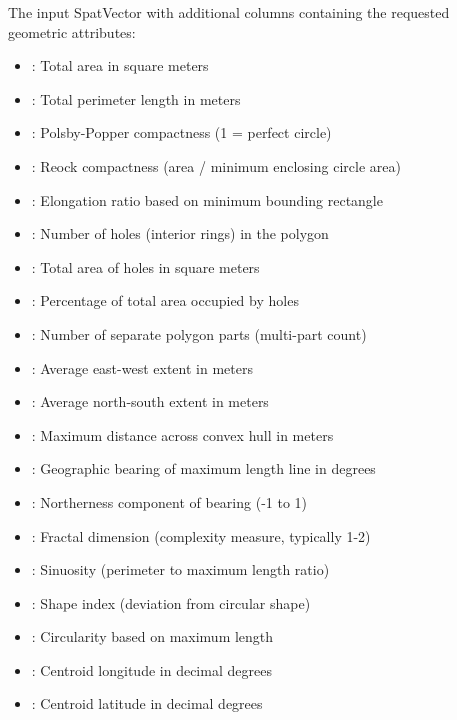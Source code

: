 \documentclass[letterpaper]{book}
\begin{document}
\begin{Value}
The input SpatVector with additional columns containing the requested
geometric attributes:
\begin{itemize}

\item{} : Total area in square meters
\item{} : Total perimeter length in meters
\item{} : Polsby-Popper compactness (1 = perfect circle)
\item{} : Reock compactness (area / minimum enclosing circle area)
\item{} : Elongation ratio based on minimum bounding rectangle
\item{} : Number of holes (interior rings) in the polygon
\item{} : Total area of holes in square meters
\item{} : Percentage of total area occupied by holes
\item{} : Number of separate polygon parts (multi-part count)
\item{} : Average east-west extent in meters
\item{} : Average north-south extent in meters
\item{} : Maximum distance across convex hull in meters
\item{} : Geographic bearing of maximum length line in degrees
\item{} : Northerness component of bearing (-1 to 1)
\item{} : Fractal dimension (complexity measure, typically 1-2)
\item{} : Sinuosity (perimeter to maximum length ratio)
\item{} : Shape index (deviation from circular shape)
\item{} : Circularity based on maximum length
\item{} : Centroid longitude in decimal degrees
\item{} : Centroid latitude in decimal degrees

\end{itemize}

\end{Value}
\end{document}

